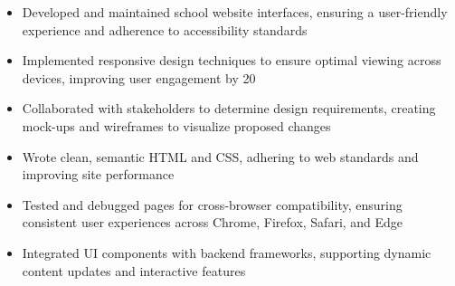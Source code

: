 \par\smallskip
\noindent
\begin{minipage}{20cm}
  \begin{minipage}{9.75cm}
    \begin{itemize}
      \item Developed and maintained school website interfaces, ensuring a user-friendly experience and adherence to accessibility standards
      \item Implemented responsive design techniques to ensure optimal viewing across devices, improving user engagement by 20%
      \item Collaborated with stakeholders to determine design requirements, creating mock-ups and wireframes to visualize proposed changes
    \end{itemize}
  \end{minipage}
  \hfill
  \begin{minipage}{9.75cm}
    \begin{itemize}
      \item Wrote clean, semantic HTML and CSS, adhering to web standards and improving site performance
      \item Tested and debugged pages for cross-browser compatibility, ensuring consistent user experiences across Chrome, Firefox, Safari, and Edge
      \item Integrated UI components with backend frameworks, supporting dynamic content updates and interactive features
    \end{itemize}
  \end{minipage}
\end{minipage}
\par\smallskip
\divider

